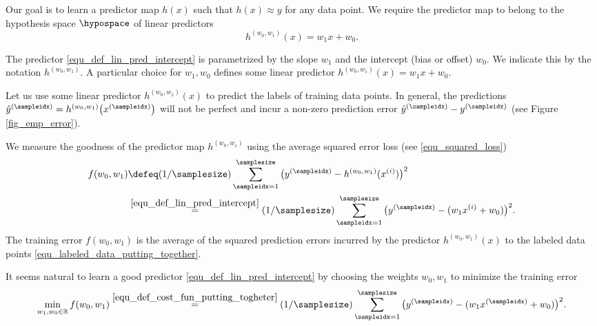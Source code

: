 \documentclass[12pt]{report}
\begin{document}
Our goal is to learn a predictor map $h(x)$ such that $h(x) \approx y$ 
for any data point. We require the predictor map to belong to 
the hypothesis space $\hypospace$ of linear predictors 
\begin{equation} 
\label{equ_def_lin_pred_intercept}
h^{(w_{0},w_{1})}(x) = w_{1} x + w_{0}. 
\end{equation}

The predictor \eqref{equ_def_lin_pred_intercept} is parametrized by the slope 
$w_{1}$ and the intercept (bias or offset) $w_{0}$. We indicate this by the 
notation $h^{(w_{0},w_{1})}$. A particular choice for $w_{1},w_{0}$ 
defines some linear predictor $h^{(w_{0},w_{1})}(x) = w_{1}x +w_{0}$. 

Let us use some linear predictor $h^{(w_{0},w_{1})}(x)$ to predict the labels of 
training data points. In general, the predictions $\hat{y}^{(\sampleidx)} = h^{(w_{0},w_{1})}\big(x^{(\sampleidx)}\big)$ 
will not be perfect and incur a non-zero prediction error $\hat{y}^{(\sampleidx)} - y^{(\sampleidx)}$ (see Figure \ref{fig_emp_error}).  

We measure the goodness of the predictor map $h^{(w_{0},w_{1})}$ 
using the average squared error loss (see \eqref{equ_squared_loss})
\begin{align}
\label{equ_def_cost_fun_putting_togheter}
f(w_{0},w_{1}) & \defeq (1/\samplesize) \sum_{\sampleidx=1}^{\samplesize} \big( y^{(\sampleidx)} - h^{(w_{0},w_{1})}(x^{(i)})  \big)^{2} \nonumber \\
& \stackrel{\eqref{equ_def_lin_pred_intercept}}{=}  (1/\samplesize) \sum_{\sampleidx=1}^{\samplesize} \big( y^{(\sampleidx)} - ( w_{1} x^{(i)} + w_{0}) \big)^{2}. 
\end{align}
The training error $f(w_{0},w_{1})$ is the average of the squared 
prediction errors incurred by the predictor $h^{(w_{0},w_{1})}(x)$ 
to the labeled data points \eqref{equ_labeled_data_putting_together}. 

It seems natural to learn a good predictor \eqref{equ_def_lin_pred_intercept} by choosing 
the weights $w_{0},w_{1}$ to minimize the training error 
\begin{equation}
\min_{w_{1},w_{0} \in \mathbb{R}} f(w_{0},w_{1}) \stackrel{\eqref{equ_def_cost_fun_putting_togheter}}{=}  (1/\samplesize) \sum_{\sampleidx=1}^{\samplesize} \big( y^{(\sampleidx)} - ( w_{1} x^{(\sampleidx)} + w_{0}) \big)^{2}.
\end{equation} 
\end{document}
